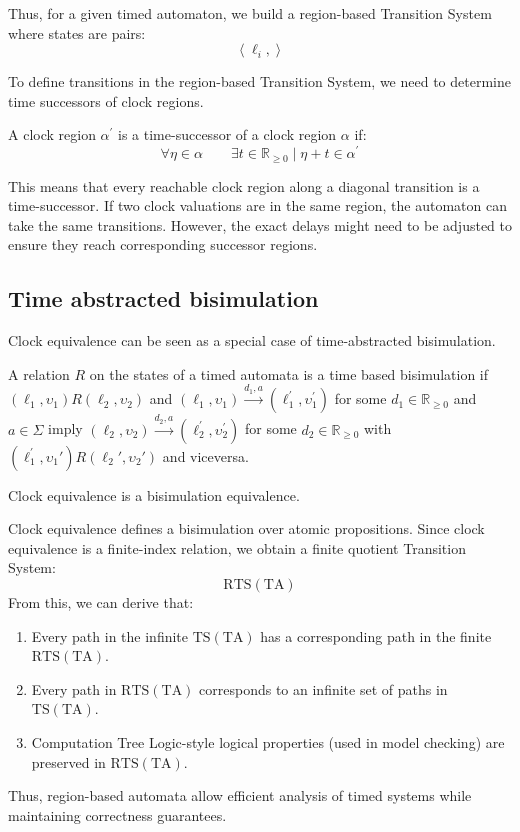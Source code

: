 Thus, for a given timed automaton, we build a region-based Transition System where states are pairs:
\[\left\langle \ell_i,\right\rangle\]

To define transitions in the region-based Transition System, we need to determine time successors of clock regions.
\begin{definition}
    A clock region $\alpha^\prime$ is a time-successor of a clock region $\alpha$ if:
    \[\forall\eta\in\alpha\qquad \exists t\in\mathbb{R}_{\geq 0}\mid \eta+t\in\alpha^\prime\]
\end{definition}
\noindent This means that every reachable clock region along a diagonal transition is a time-successor.
If two clock valuations are in the same region, the automaton can take the same transitions.
However, the exact delays might need to be adjusted to ensure they reach corresponding successor regions.

\subsection{Time abstracted bisimulation}
Clock equivalence can be seen as a special case of time-abstracted bisimulation.
\begin{definition}
    A relation $R$ on the states of a timed automata is a time based bisimulation if $(\ell_1,\upsilon_1)R(\ell_2,\upsilon_2)$ and $(\ell_1,\upsilon_1)\xrightarrow{d_1,a}(\ell_1^\prime,\upsilon_1^\prime)$ for some $d_1 \in\mathbb{R}_{\geq 0}$ and $a\in\Sigma$ imply $(\ell_2,\upsilon_2)\xrightarrow{d_2,a}(\ell_2^\prime,\upsilon_2^\prime)$ for some $d_2 \in\mathbb{R}_{\geq 0}$ with $(\ell_1^\prime,\upsilon_1\prime)R(\ell_2\prime,\upsilon_2\prime)$ and viceversa. 
\end{definition}
\begin{theorem}
    Clock equivalence is a bisimulation equivalence.
\end{theorem}
\noindent Clock equivalence defines a bisimulation over atomic propositions. 
Since clock equivalence is a finite-index relation, we obtain a finite quotient Transition System:
\[\text{RTS}(\text{TA})\] 
\noindent From this, we can derive that: 
\begin{enumerate}
    \item Every path in the infinite $\text{TS}(\text{TA})$ has a corresponding path in the finite $\text{RTS}(\text{TA})$.
    \item Every path in $\text{RTS}(\text{TA})$ corresponds to an infinite set of paths in $\text{TS}(\text{TA})$.
    \item Computation Tree Logic-style logical properties (used in model checking) are preserved in $\text{RTS}(\text{TA})$.
\end{enumerate}
\noindent Thus, region-based automata allow efficient analysis of timed systems while maintaining correctness guarantees.